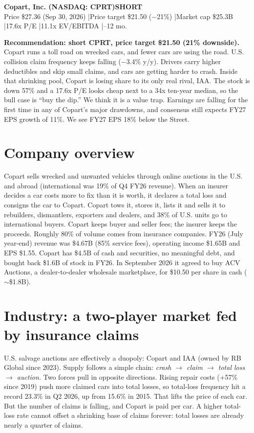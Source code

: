 \documentclass[10pt]{article}
\begin{document}
\small

{\color{navy}\Large\bfseries Copart, Inc. (NASDAQ: CPRT)}\hfill{\color{navy}\bfseries\Large SHORT}\\[1pt]
{\footnotesize Price \$27.36 (Sep 30, 2026) \quad|\quad Price target \$21.50 ($-$21\%) \quad|\quad Market cap \$25.3B \quad|\quad 17.6x P/E \quad|\quad 11.1x EV/EBITDA \quad|--12 mo.}

\vspace{3pt}
\colorbox{soft}{\parbox{\dimexpr\linewidth-2\fboxsep}{
\textbf{Recommendation: short CPRT, price target \$21.50 (21\% downside).} Copart runs a toll road on wrecked cars, and fewer cars are using the road. U.S. collision claim frequency keeps falling ($-$3.4\% y/y). Drivers carry higher deductibles and skip small claims, and cars are getting harder to crash. Inside that shrinking pool, Copart is losing share to its only real rival, IAA. The stock is down 57\% and a 17.6x P/E looks cheap next to a 34x ten-year median, so the bull case is ``buy the dip.'' We think it is a value trap. Earnings are falling for the first time in any of Copart's major drawdowns, and consensus still expects FY27 EPS growth of 11\%. We see FY27 EPS 18\% below the Street.}}

\section{Company overview}
Copart sells wrecked and unwanted vehicles through online auctions in the U.S. and abroad (international was 19\% of Q4 FY26 revenue). When an insurer decides a car costs more to fix than it is worth, it declares a total loss and consigns the car to Copart. Copart tows it, stores it, lists it and sells it to rebuilders, dismantlers, exporters and dealers, and 38\% of U.S. units go to international buyers. Copart keeps buyer and seller fees; the insurer keeps the proceeds. Roughly 80\% of volume comes from insurance companies. FY26 (July year-end) revenue was \$4.67B (85\% service fees), operating income \$1.65B and EPS \$1.55. Copart has \$4.5B of cash and securities, no meaningful debt, and bought back \$1.6B of stock in FY26. In September 2026 it agreed to buy ACV Auctions, a dealer-to-dealer wholesale marketplace, for \$10.50 per share in cash ($\sim$\$1.8B).

\section{Industry: a two-player market fed by insurance claims}
U.S. salvage auctions are effectively a duopoly: Copart and IAA (owned by RB Global since 2023). Supply follows a simple chain: \emph{crash $\rightarrow$ claim $\rightarrow$ total loss $\rightarrow$ auction.} Two forces pull in opposite directions. Rising repair costs (+57\% since 2019) push more claimed cars into total losses, so total-loss frequency hit a record 23.3\% in Q2 2026, up from 15.6\% in 2015. That lifts the price of each car. But the number of claims is falling, and Copart is paid per car. A higher total-loss rate cannot offset a shrinking base of claims forever: total losses are already nearly a quarter of claims.
\end{document}

